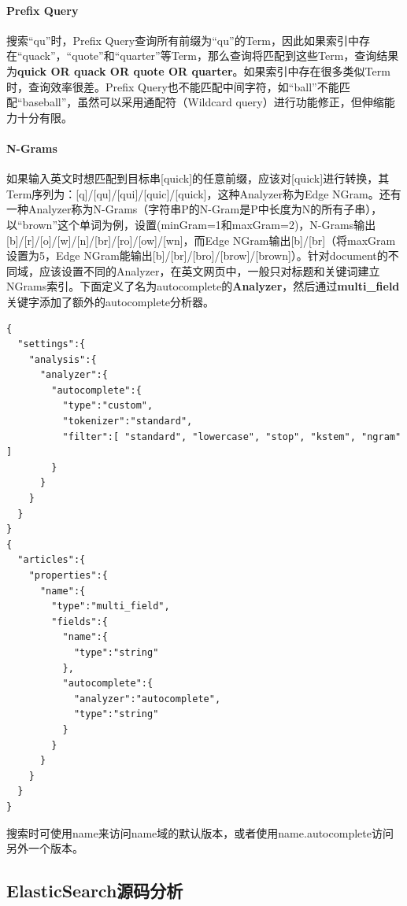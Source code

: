 \paragraph{Prefix Query}
搜索“qu”时，Prefix Query查询所有前缀为“qu”的Term，因此如果索引中存在“quack”，“quote”和“quarter”等Term，那么查询将匹配到这些Term，查询结果为\textbf{quick OR quack OR quote OR quarter}。如果索引中存在很多类似Term时，查询效率很差。Prefix Query也不能匹配中间字符，如“ball”不能匹配“baseball”，虽然可以采用通配符（Wildcard query）进行功能修正，但伸缩能力十分有限。
\paragraph{N-Grams}
如果输入英文时想匹配到目标串[quick]的任意前缀，应该对[quick]进行转换，其Term序列为：[q]/[qu]/[qui]/[quic]/[quick]，这种Analyzer称为Edge NGram。还有一种Analyzer称为N-Grams（字符串P的N-Gram是P中长度为N的所有子串），以“brown”这个单词为例，设置(minGram=1和maxGram=2)，N-Grams输出[b]/[r]/[o]/[w]/[n]/[br]/[ro]/[ow]/[wn]，而Edge NGram输出[b]/[br]（将maxGram设置为5，Edge NGram能输出[b]/[br]/[bro]/[brow]/[brown]）。针对document的不同域，应该设置不同的Analyzer，在英文网页中，一般只对标题和关键词建立NGrams索引。下面定义了名为autocomplete的\textbf{Analyzer}，然后通过\textbf{multi\_field}关键字添加了额外的autocomplete分析器。
\begin{verbatim}
{
  "settings":{
    "analysis":{
      "analyzer":{
        "autocomplete":{
          "type":"custom",
          "tokenizer":"standard",
          "filter":[ "standard", "lowercase", "stop", "kstem", "ngram" ] 
        }
      }
    }
  }
}
{
  "articles":{
    "properties":{
      "name":{
        "type":"multi_field",
        "fields":{
          "name":{
            "type":"string"
          },
          "autocomplete":{
            "analyzer":"autocomplete",
            "type":"string"
          }
        }
      }
    }
  }
}
\end{verbatim}
\par 搜索时可使用name来访问name域的默认版本，或者使用name.autocomplete访问另外一个版本。
\subsection{ElasticSearch源码分析}
